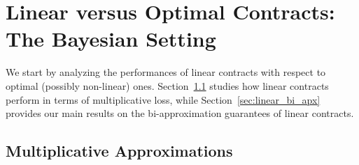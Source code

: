 \section{Linear versus Optimal Contracts: The Bayesian Setting}\label{sec:linear}

We start by analyzing the performances of linear contracts with respect to optimal (possibly non-linear) ones.
%
Section~\ref{sec:linear_vs_optimal} studies how linear contracts perform in terms of multiplicative loss, while Section~\ref{sec:linear_bi_apx} provides our main results on the bi-approximation guarantees of linear contracts.



\subsection{Multiplicative Approximations}\label{sec:linear_vs_optimal}


